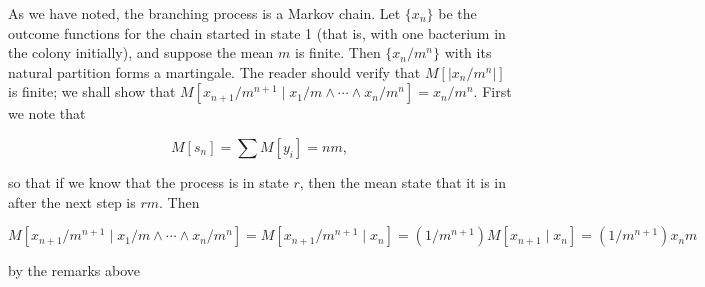 As we have noted, the branching process is a Markov chain. Let $\{x_n\}$ be the outcome functions for the chain started in state 1 (that is, with one bacterium in the colony initially), and suppose the mean $m$ is finite. Then $\{x_n/m^n\}$ with its natural partition forms a martingale. The reader should verify that $M[|x_n/m^n|]$ is finite; we shall show that $M[x_{n+1}/m^{n+1} \mid x_1/m \land \cdots \land x_n/m^n] = x_n/m^n$. First we note that

$$M[s_n] = \sum M[y_i] = nm,$$

so that if we know that the process is in state $r$, then the mean state that it is in after the next step is $rm$. Then

$$M[x_{n+1}/m^{n+1} \mid x_1/m \land \cdots \land x_n/m^n] = M[x_{n+1}/m^{n+1} \mid x_n] = (1/m^{n+1})M[x_{n+1} \mid x_n] = (1/m^{n+1})x_n m$$

by the remarks above

